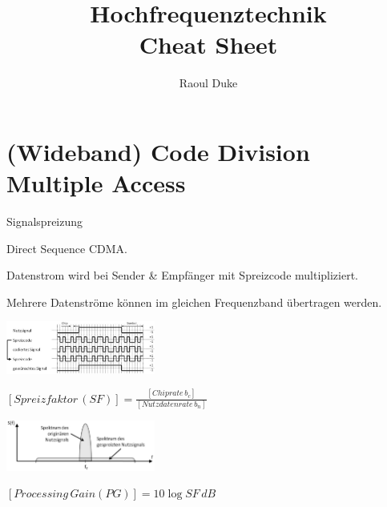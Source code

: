 \documentclass[german]{latex4ei/latex4ei_sheet}
\title{Hochfrequenztechnik \\ Cheat Sheet}
\author{Raoul Duke}
\begin{document}
\maketitle

\section{(Wideband) Code Division Multiple Access}
\begin{sectionbox}
    \begin{bluebox}{Signalspreizung}
        \item Direct Sequence CDMA.
        \item Datenstrom wird bei Sender \& Empfänger mit Spreizcode multipliziert.
        \item Mehrere Datenströme können im gleichen Frequenzband übertragen werden.
        \item \includegraphics[width=185px]{img/Signalspreizung.png}
        \item $[Spreizfaktor\,(SF)] = \frac{[Chiprate\, b_c]}{[Nutzdatenrate\,b_n]}$
        \item \includegraphics[width=185px]{img/SpektrumSpreizung.png} 
        \item $[Processing\, Gain (PG)] = 10\log SF\,dB$
    \end{bluebox}
\end{sectionbox}
\end{document}
